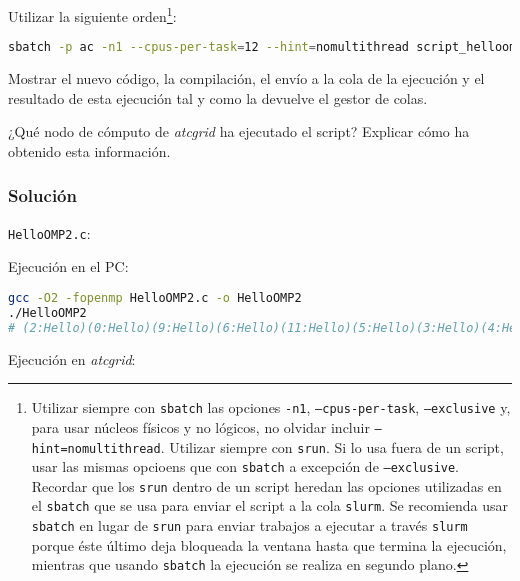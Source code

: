 Utilizar la siguiente orden\footnote{%
	Utilizar siempre con \texttt{sbatch} las opciones \texttt{-n1}, \texttt{--cpus-per-task}, \texttt{--exclusive} y, para usar núcleos físicos y no lógicos, no olvidar incluir \texttt{--hint=nomultithread}.
	Utilizar siempre con \texttt{srun}.
	Si lo usa fuera de un script, usar las mismas opcioens que con \texttt{sbatch} a excepción de \texttt{--exclusive}.
	Recordar que los \texttt{srun} dentro de un script heredan las opciones utilizadas en el \texttt{sbatch} que se usa para enviar el script a la cola \texttt{slurm}.
	Se recomienda usar \texttt{sbatch} en lugar de \texttt{srun} para enviar trabajos a ejecutar a través \texttt{slurm} porque éste último deja bloqueada la ventana hasta que termina la ejecución, mientras que usando \texttt{sbatch} la ejecución se realiza en segundo plano.
}:

\begin{lstlisting}[language=sh]
sbatch -p ac -n1 --cpus-per-task=12 --hint=nomultithread script_helloomp.sh
\end{lstlisting}

Mostrar el nuevo código, la compilación, el envío a la cola de la ejecución y el resultado de esta ejecución tal y como la devuelve el gestor de colas.

¿Qué nodo de cómputo de \textit{atcgrid} ha ejecutado el script?
Explicar cómo ha obtenido esta información.

\subsubsection{Solución}

\texttt{HelloOMP2.c}:


Ejecución en el PC\@:
\begin{lstlisting}[language=sh]
gcc -O2 -fopenmp HelloOMP2.c -o HelloOMP2
./HelloOMP2
# (2:Hello)(0:Hello)(9:Hello)(6:Hello)(11:Hello)(5:Hello)(3:Hello)(4:Hello)(10:Hello)(1:Hello)(7:Hello)(8:Hello)(0:World)
\end{lstlisting}

Ejecución en \textit{atcgrid}:

